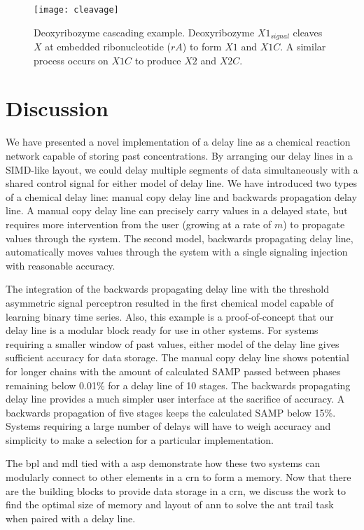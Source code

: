 \begin{figure}[ht]
	\centering
	\texttt{[image: cleavage]}
	\caption[Example of Deoxyribozyme Implementation]{Deoxyribozyme cascading example. Deoxyribozyme $X1_{signal}$ cleaves $X$ at embedded ribonucleotide ($rA$) to form $X1$ and $X1C$. A similar process occurs on $X1C$ to produce $X2$ and $X2C$.}
	\label{fig:deoxy1}
\end{figure}

\section{Discussion}
We have presented a novel implementation of a delay line as a chemical reaction network capable of storing past concentrations. By arranging our delay lines in a SIMD-like layout, we could delay multiple segments of data simultaneously with a shared control signal for either model of delay line. We have introduced two types of a chemical delay line: manual copy delay line and backwards propagation delay line. A manual copy delay line can precisely carry values in a delayed state, but requires more intervention from the user (growing at a rate of $m$) to propagate values through the system. The second model, backwards propagating delay line, automatically moves values through the system with a single signaling injection with reasonable accuracy.

The integration of the backwards propagating delay line with the threshold asymmetric signal perceptron resulted in the first chemical model capable of learning binary time series. Also, this example is a proof-of-concept that our delay line is a modular block ready for use in other systems. For systems requiring a smaller window of past values, either model of the delay line gives sufficient accuracy for data storage. The manual copy delay line shows potential for longer chains with the amount of calculated SAMP passed between phases remaining below 0.01\% for a delay line of 10 stages. The backwards propagating delay line provides a much simpler user interface at the sacrifice of accuracy. A backwards propagation of five stages keeps the calculated SAMP below 15\%. Systems requiring a large number of delays will have to weigh accuracy and simplicity to make a selection for a particular implementation.

The \gls{bpl} and \gls{mdl} tied with a \gls{asp} demonstrate how these two systems can modularly connect to other elements in a \gls{crn} to form a memory. Now that there are the building blocks to provide data storage in a \gls{crn}, we discuss the work to find the optimal size of memory and layout of \gls{ann} to solve the ant trail task when paired with a delay line.


